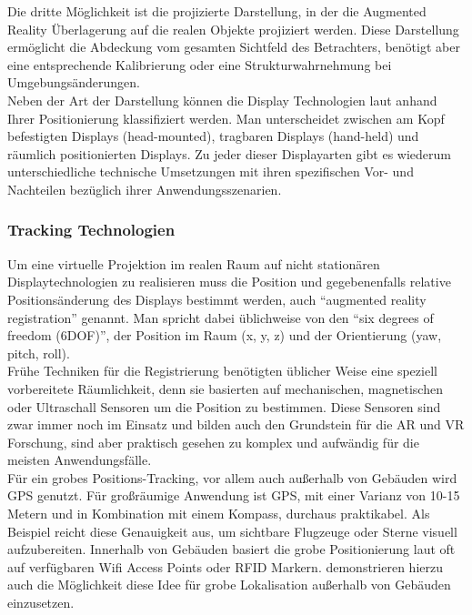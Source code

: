 Die dritte Möglichkeit ist die projizierte Darstellung, in der die Augmented Reality Überlagerung auf die realen Objekte projiziert werden. Diese Darstellung ermöglicht die Abdeckung vom gesamten Sichtfeld des Betrachters, benötigt aber eine entsprechende Kalibrierung oder eine Strukturwahrnehmung bei Umgebungsänderungen.\\

Neben der Art der Darstellung können die Display Technologien laut \citet{azuma2001recent} anhand Ihrer Positionierung klassifiziert werden. Man unterscheidet zwischen am Kopf befestigten Displays (head-mounted), tragbaren Displays (hand-held) und räumlich positionierten Displays. Zu jeder dieser Displayarten gibt es wiederum unterschiedliche technische Umsetzungen mit ihren spezifischen Vor- und Nachteilen bezüglich ihrer Anwendungsszenarien.\\

\subsubsection{Tracking Technologien}

Um eine virtuelle Projektion im realen Raum auf nicht stationären Displaytechnologien zu realisieren muss die Position und gegebenenfalls relative Positionsänderung des Displays bestimmt werden, auch \enquote{augmented reality registration} genannt. Man spricht dabei üblichweise von den \enquote{six degrees of freedom (6DOF)}, der Position im Raum (x, y, z) und der Orientierung (yaw, pitch, roll). \\

Frühe Techniken für die Registrierung benötigten üblicher Weise eine speziell vorbereitete Räumlichkeit, denn sie basierten auf mechanischen, magnetischen oder Ultraschall Sensoren um die Position zu bestimmen. Diese Sensoren sind zwar immer noch im Einsatz und bilden auch den Grundstein für die AR und VR Forschung, sind aber praktisch gesehen zu komplex und aufwändig für die meisten Anwendungsfälle. \citep{van2010survey} \\

Für ein grobes Positions-Tracking, vor allem auch außerhalb von Gebäuden wird GPS genutzt. Für großräumige Anwendung ist GPS, mit einer Varianz von 10-15 Metern und in Kombination mit einem Kompass, durchaus praktikabel. Als Beispiel reicht diese Genauigkeit aus, um sichtbare Flugzeuge oder Sterne visuell aufzubereiten. Innerhalb von Gebäuden basiert die grobe Positionierung laut \citet{van2010survey} oft auf verfügbaren Wifi Access Points oder RFID Markern. \citet{lamarca2005place} demonstrieren hierzu auch die Möglichkeit diese Idee für grobe Lokalisation außerhalb von Gebäuden einzusetzen.\\

